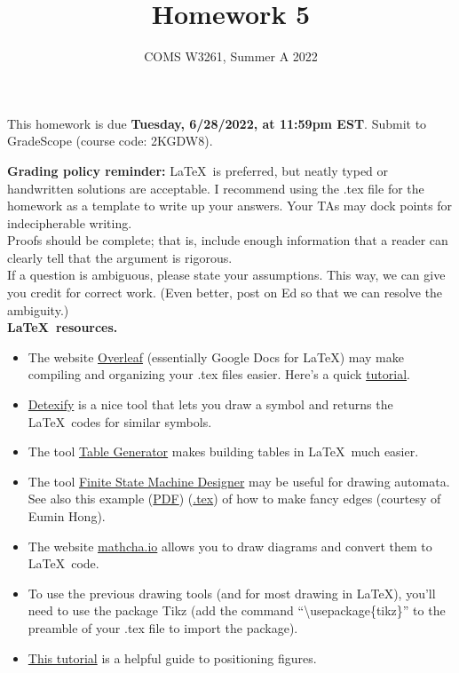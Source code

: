 \documentclass[letterpaper,11pt,twoside]{article}
\title{Homework 5}
\date{COMS W3261, Summer A 2022}
\theoremstyle{plain}
\theoremstyle{definition}
\theoremstyle{remark}
\theoremstyle{restate}
\begin{document}
\maketitle

This homework is due \textbf{Tuesday, 6/28/2022, at 11:59pm EST}. Submit to GradeScope (course code: 2KGDW8).

\textbf{Grading policy reminder:} \LaTeX~is preferred, but neatly typed or handwritten solutions are acceptable. I recommend using the .tex file for the homework as a template to write up your answers. Your TAs may dock points for indecipherable writing.\\

Proofs should be complete; that is, include enough information that a reader can clearly tell that the argument is rigorous. \\

If a question is ambiguous, please state your assumptions. This way, we can give you credit for correct work. (Even better, post on Ed so that we can resolve the ambiguity.) \\

\textbf{\LaTeX~resources.}
\begin{itemize}
    \item The website \href{https://www.overleaf.com/}{Overleaf} (essentially Google Docs for LaTeX) may make compiling and organizing your .tex files easier. Here's a quick \href{https://www.overleaf.com/learn/latex/Learn_LaTeX_in_30_minutes}{tutorial}.
    \item \href{https://detexify.kirelabs.org/classify.html}{Detexify} is a nice tool that lets you draw a symbol and returns the \LaTeX~codes for similar symbols. 
    \item The tool \href{https://www.tablesgenerator.com/}{Table Generator} makes building tables in \LaTeX~much easier.
    \item The tool \href{http://madebyevan.com/fsm/}{Finite State Machine Designer} may be useful for drawing automata. See also this example (\href{https://static.us.edusercontent.com/files/HZeTXimODzWeLvHIqsvjL2BG}{PDF}) (\href{https://static.us.edusercontent.com/files/RI3W8tQNvHMWFe9MkXV1KztA}{.tex}) of how to make fancy edges (courtesy of Eumin Hong).
    \item The website \href{https://www.mathcha.io/}{mathcha.io} allows you to draw diagrams and convert them to \LaTeX~code.
    \item To use the previous drawing tools (and for most drawing in \LaTeX), you'll need to use the package Tikz (add the command ``\textbackslash usepackage\{tikz\}'' to the preamble of your .tex file to import the package). 
    \item \href{https://www.overleaf.com/learn/latex/Positioning_of_Figures}{This tutorial} is a helpful guide to positioning figures.
\end{itemize}  
\end{document}
